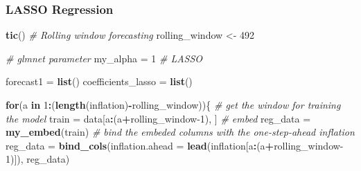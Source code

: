 \documentclass[
]{article}
\newenvironment{Shaded}{\begin{snugshade}}{\end{snugshade}}
\newcommand{\AttributeTok}[1]{\textcolor[rgb]{0.13,0.29,0.53}{#1}}
\newcommand{\CommentTok}[1]{\textcolor[rgb]{0.56,0.35,0.01}{\textit{#1}}}
\newcommand{\ControlFlowTok}[1]{\textcolor[rgb]{0.13,0.29,0.53}{\textbf{#1}}}
\newcommand{\DecValTok}[1]{\textcolor[rgb]{0.00,0.00,0.81}{#1}}
\newcommand{\FunctionTok}[1]{\textcolor[rgb]{0.13,0.29,0.53}{\textbf{#1}}}
\newcommand{\NormalTok}[1]{#1}
\newcommand{\OtherTok}[1]{\textcolor[rgb]{0.56,0.35,0.01}{#1}}
\newcommand{\SpecialCharTok}[1]{\textcolor[rgb]{0.81,0.36,0.00}{\textbf{#1}}}
\begin{document}
\hypertarget{lasso-regression}{%
\subsubsection{LASSO Regression}\label{lasso-regression}}

\begin{Shaded}
\begin{Highlighting}[]
\FunctionTok{tic}\NormalTok{()}
\CommentTok{\# Rolling window forecasting}
\NormalTok{rolling\_window }\OtherTok{\textless{}{-}} \DecValTok{492}

\CommentTok{\# glmnet parameter}
\NormalTok{my\_alpha }\OtherTok{=} \DecValTok{1} \CommentTok{\# LASSO}

\NormalTok{forecast1 }\OtherTok{=} \FunctionTok{list}\NormalTok{()}
\NormalTok{coefficients\_lasso }\OtherTok{=} \FunctionTok{list}\NormalTok{()}


\ControlFlowTok{for}\NormalTok{(a }\ControlFlowTok{in} \DecValTok{1}\SpecialCharTok{:}\NormalTok{(}\FunctionTok{length}\NormalTok{(inflation)}\SpecialCharTok{{-}}\NormalTok{rolling\_window))\{}
  \CommentTok{\# get the window for training the model}
\NormalTok{  train }\OtherTok{=}\NormalTok{ data[a}\SpecialCharTok{:}\NormalTok{(a}\SpecialCharTok{+}\NormalTok{rolling\_window}\DecValTok{{-}1}\NormalTok{), ]}
  \CommentTok{\# embed}
\NormalTok{  reg\_data }\OtherTok{=} \FunctionTok{my\_embed}\NormalTok{(train)}
  \CommentTok{\# bind the embeded columns with the one{-}step{-}ahead inflation}
\NormalTok{  reg\_data }\OtherTok{=} \FunctionTok{bind\_cols}\NormalTok{(}\AttributeTok{inflation.ahead =} \FunctionTok{lead}\NormalTok{(inflation[a}\SpecialCharTok{:}\NormalTok{(a}\SpecialCharTok{+}\NormalTok{rolling\_window}\DecValTok{{-}1}\NormalTok{)]), reg\_data) }
  

\end{Highlighting}
\end{Shaded}
\end{document}
